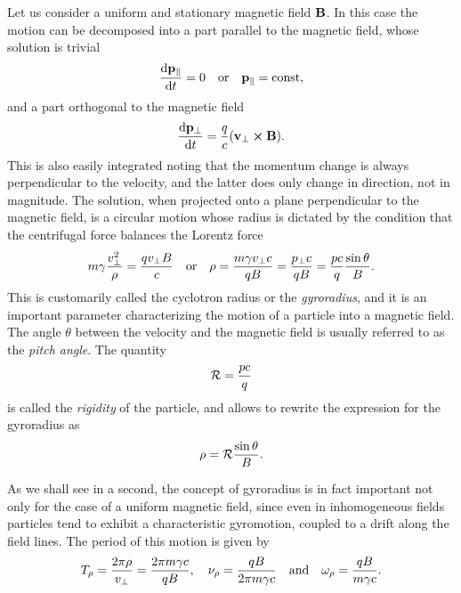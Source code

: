 Let us consider a uniform and stationary magnetic field $\vb{B}$. In this case the
motion can be decomposed into a part parallel to the magnetic field, whose
solution is trivial
\begin{align*}
  \dv{\vb{p}_\parallel}{t} = 0
  \quad\text{or}\quad
  \vb{p}_\parallel = \text{const},
\end{align*}
and a part orthogonal to the magnetic field
\begin{align*}
  \dv{\vb{p}_\perp}{t} = \frac{q}{c} (\vb{v}_\perp \cross \vb{B}).
\end{align*}
This is also easily integrated noting that the momentum change is always
perpendicular to the velocity, and the latter does only change in direction, not
in magnitude. The solution, when projected onto a plane perpendicular to the
magnetic field, is a circular motion whose radius is dictated by the condition
that the centrifugal force balances the Lorentz force
\begin{align}\label{eq:gyrorad}
  m \gamma \frac{v_\perp^2}{\rho} = \frac{qv_\perp B}{c}
  \quad\text{or}\quad
  \rho = \frac{m\gamma v_\perp c}{qB} = \frac{p_\perp c}{qB} =
  \frac{pc}{q} \frac{\sin\theta}{B}.
\end{align}
This is customarily called the cyclotron radius or  the \emph{gyroradius}, and it
is an important parameter characterizing the motion of a particle into a magnetic
field. The angle $\theta$ between the velocity and the magnetic field is usually
referred to as the \emph{pitch angle}. The quantity
\begin{align}
  \mathcal{R} = \frac{pc}{q}
\end{align}
is called the \emph{rigidity} of the particle, and allows to rewrite the
expression for the gyroradius as
\begin{align*}
  \rho = \mathcal{R} \frac{\sin\theta}{B}.
\end{align*}

As we shall see in a second, the concept of gyroradius is in fact important not
only for the case of a uniform magnetic field, since even in inhomogeneous fields
particles tend to exhibit a characteristic gyromotion, coupled to a drift along the
field lines. The period of this motion is given by
\begin{align}
  T_{\rho} = \frac{2\pi \rho}{v_\perp} = \frac{2\pi m \gamma c}{qB}, \quad
  \nu_{\rho} = \frac{qB}{2\pi m \gamma c} \quad\text{and}\quad
  \omega_{\rho} = \frac{qB}{m \gamma c}.
\end{align}

